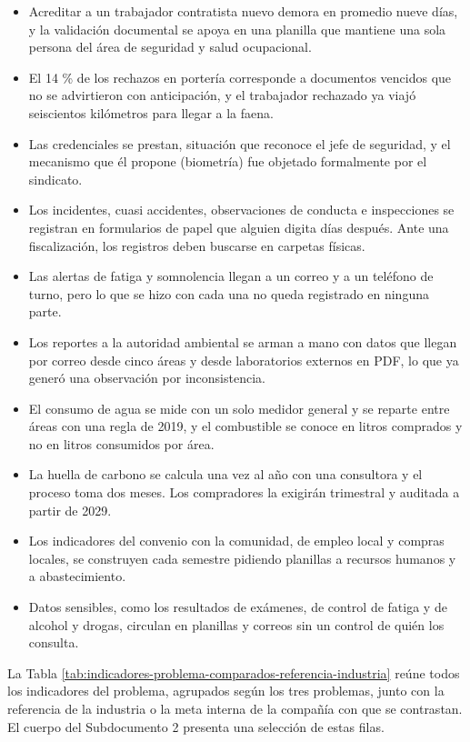 \documentclass[anexo]{../../comun/overfore}
\begin{document}
\begin{itemize}
\item Acreditar a un trabajador contratista nuevo demora en promedio nueve días, y la validación documental se apoya en una planilla que mantiene una sola persona del área de seguridad y salud ocupacional.
\item El 14 \% de los rechazos en portería corresponde a documentos vencidos que no se advirtieron con anticipación, y el trabajador rechazado ya viajó seiscientos kilómetros para llegar a la faena.
\item Las credenciales se prestan, situación que reconoce el jefe de seguridad, y el mecanismo que él propone (biometría) fue objetado formalmente por el sindicato.
\item Los incidentes, cuasi accidentes, observaciones de conducta e inspecciones se registran en formularios de papel que alguien digita días después. Ante una fiscalización, los registros deben buscarse en carpetas físicas.
\item Las alertas de fatiga y somnolencia llegan a un correo y a un teléfono de turno, pero lo que se hizo con cada una no queda registrado en ninguna parte.
\item Los reportes a la autoridad ambiental se arman a mano con datos que llegan por correo desde cinco áreas y desde laboratorios externos en PDF, lo que ya generó una observación por inconsistencia.
\item El consumo de agua se mide con un solo medidor general y se reparte entre áreas con una regla de 2019, y el combustible se conoce en litros comprados y no en litros consumidos por área.
\item La huella de carbono se calcula una vez al año con una consultora y el proceso toma dos meses. Los compradores la exigirán trimestral y auditada a partir de 2029.
\item Los indicadores del convenio con la comunidad, de empleo local y compras locales, se construyen cada semestre pidiendo planillas a recursos humanos y a abastecimiento.
\item Datos sensibles, como los resultados de exámenes, de control de fatiga y de alcohol y drogas, circulan en planillas y correos sin un control de quién los consulta.
\end{itemize}

La Tabla \ref{tab:indicadores-problema-comparados-referencia-industria} reúne todos los indicadores del problema, agrupados según los tres problemas, junto con la referencia de la industria o la meta interna de la compañía con que se contrastan. El cuerpo del Subdocumento 2 presenta una selección de estas filas.
\end{document}
